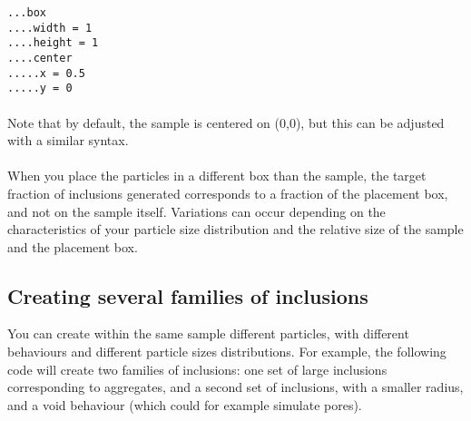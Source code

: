 \documentclass[10pt]{article}
\begin{document}
\noindent \verb+...box+\\
\verb+....width = 1+\\
\verb+....height = 1+\\
\verb+....center+\\
\verb+.....x = 0.5+\\
\verb+.....y = 0+

\paragraph{}Note that by default, the sample is centered on (0,0), but this can be adjusted with a similar syntax.

\paragraph{}When you place the particles in a different box than the sample, the target fraction of inclusions generated corresponds to a fraction of the placement box, and not on the sample itself. Variations can occur depending on the characteristics of your particle size distribution and the relative size of the sample and the placement box.

\subsection{Creating several families of inclusions}

You can create within the same sample different particles, with different behaviours and different particle sizes distributions. For example, the following code will create two families of inclusions: one set of large inclusions corresponding to aggregates, and a second set of inclusions, with a smaller radius, and a void behaviour (which could for example simulate pores).\\
\end{document}
